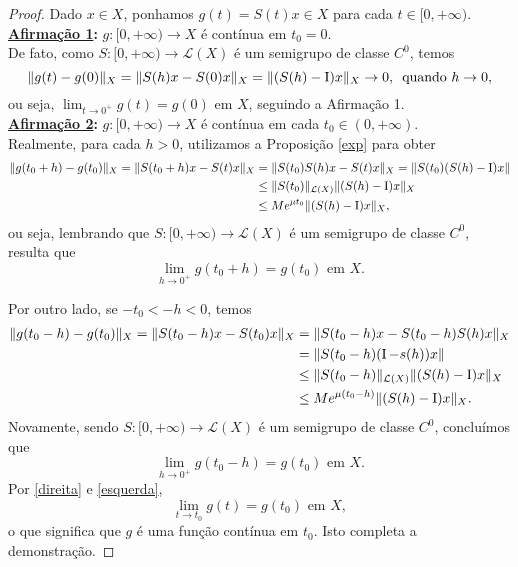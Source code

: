 \begin{proof}
    Dado $x\in X$, ponhamos $g(t)=S(t)x \in X$ para cada $t\in [0,+\infty)$. \\

\noindent\textbf{\underline{Afirmação 1}:} $g:[0,+\infty) \longrightarrow X$ é contínua em $t_0 =0$. \\

    De fato, como $S:[0,+\infty) \longrightarrow \mathcal L (X)$ é um semigrupo de classe $C^0$, temos
    \[
    \|g(t)-g(0)\|_X =\|S(h)x-S(0)x\|_{X}=\|(S(h)-\operatorname{I})x\|_{X} \to 0,\, \text{ quando } h\to 0,
    \]
    ou seja, $\displaystyle\lim_{t\to 0^+} g(t) = g(0)$ em $X$, seguindo a Afirmação 1. \\

\noindent\textbf{\underline{Afirmação 2}:} $g:[0,+\infty) \longrightarrow X$ é contínua em cada $t_0 \in (0,+\infty )$. \\

    Realmente, para cada $h>0$, utilizamos a Proposição \ref{exp} para obter
    \begin{align*}
    \displaystyle \|g(t_0 +h)-g(t_0)\|_X
    =\|S(t_0+h)x-S(t)x\|_X& =\|S(t_0)S(h)x-S(t)x\|_X=\|S(t_0)(S(h)-\operatorname{I})x\|\\
    & \leq \|S(t_0)\|_{\mathcal{L}(X)}\|(S(h)-\operatorname{I})x\|_X \\
    & \leq Me^{\mu t_0}\|(S(h)-\operatorname{I})x\|_X,
\end{align*}
ou seja, lembrando que $S:[0,+\infty)\longrightarrow \mathcal L (X)$ é um semigrupo de classe $C^0$, resulta que
\begin{equation}\label{direita}
\displaystyle\lim_{h\to 0^+} g(t_0 +h)=g(t_0) \text{ em } X.
\end{equation}

Por outro lado, se $-t_0< -h <0$, temos
\begin{align*}
    \displaystyle \|g(t_0 -h)-g(t_0)\|_X
    =\|S(t_0-h)x-S(t_0)x\|_X& =\|S(t_0 -h)x-S(t_0-h) S(h)x\|_X \\
    &=\|S(t_0-h)(\operatorname{I} -s(h))x\|\\
    & \leq \|S(t_0 -h)\|_{\mathcal{L}(X)}\|(S(h)-\operatorname{I})x\|_X \\
    & \leq Me^{\mu (t_0-h)}\|(S(h)-\operatorname{I})x\|_X.
\end{align*}
Novamente, sendo $S:[0,+\infty)\longrightarrow \mathcal L (X)$ é um semigrupo de classe $C^0$, concluímos que 
\begin{equation}\label{esquerda}
\displaystyle\lim_{h\to 0^+} g(t_0 -h)=g(t_0) \text{ em } X.
\end{equation}
Por \eqref{direita} e \eqref{esquerda}, 
\[
\displaystyle\lim_{t\to t_0} g(t)=g(t_0) \text{ em } X,
\]
o que significa que $g$ é uma função contínua em $t_0$. Isto completa a demonstração.


\end{proof}
